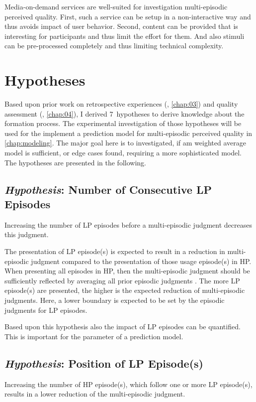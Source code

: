 Media-on-demand services are well-suited for investigation multi-episodic perceived quality.
First, such a service can be setup in a non-interactive way and thus avoids impact of user behavior.
Second, content can be provided that is interesting for participants and thus limit the effort for them.
And also stimuli can be pre-processed completely and thus limiting technical complexity.

\section{Hypotheses}
Based upon prior work on retrospective experiences (\cf, \autoref{chap:03}) and quality assessment (\cf, \autoref{chap:04}), I derived 7~hypotheses to derive knowledge about the formation process.
The experimental investigation of those hypotheses will be used for the implement a prediction model for multi-episodic perceived quality in \autoref{chap:modeling}.
The major goal here is to investigated, if am weighted average model is sufficient, or edge cases found, requiring a more sophisticated model.
The hypotheses are presented in the following.

\subsection{\emph{Hypothesis}: Number of Consecutive \acs{LP} Episodes}
\begin{hypothesis}\label{hypo:number}
Increasing the number of \ac{LP} episodes before a multi-episodic judgment decreases this judgment.
\end{hypothesis}

The presentation of \ac{LP} episode(s) is expected to result in a reduction in multi-episodic judgment compared to the presentation of those usage episode(s) in \ac{HP}.
When presenting all episodes in \ac{HP}, then the multi-episodic judgment should be sufficiently reflected by averaging all prior episodic judgments \citep[\cf,][]{moller_single-call_2011}.
The more \ac{LP} episode(s) are presented, the higher is the expected reduction of multi-episodic judgments.
Here, a lower boundary is expected to be set by the episodic judgments for \ac{LP} episodes.

Based upon this hypothesis also the impact of \ac{LP} episodes can be quantified.
This is important for the parameter of a prediction model.


\subsection{\emph{Hypothesis}: Position of \acs{LP} Episode(s)}
\begin{hypothesis}\label{hypo:position}
Increasing the number of \ac{HP} episode(s), which follow one or more \ac{LP} episode(s), results in a lower reduction of the multi-episodic judgment.
\end{hypothesis}

